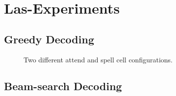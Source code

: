 \section{Las-Experiments}
\subsection{Greedy Decoding}
\begin{figure}
\centering


\caption{Two different attend and spell cell configurations.}
\end{figure}


\subsection{Beam-search Decoding}